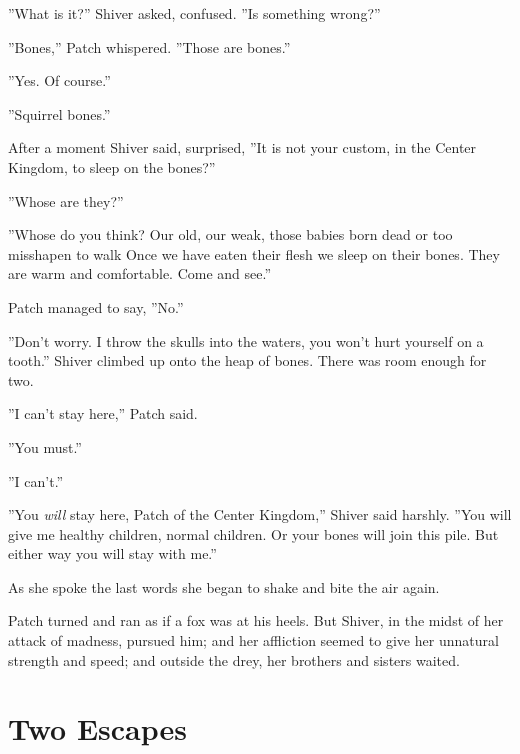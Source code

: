 \documentclass[12pt]{book}
\begin{document}
''What is it?'' Shiver asked, confused. ''Is something wrong?''\par
''Bones,'' Patch whispered. ''Those are bones.''\par
''Yes. Of course.''\par
''Squirrel bones.''\par
After a moment Shiver said, surprised, ''It is not your custom, in the Center Kingdom, to sleep on the bones?''\par
''Whose are they?''\par
''Whose do you think? Our old, our weak, those babies born dead or too misshapen to walk%
Once we have eaten their flesh we sleep on their bones. They are warm and comfortable. Come and see.''\par
Patch managed to say, ''No.''\par
''Don't worry. I throw the skulls into the waters, you won't hurt yourself on a tooth.'' Shiver climbed up onto the heap of bones. There was room enough for two.\par
 ''I can't stay here,'' Patch said.\par
 ''You must.''\par
 ''I can't.''\par
 ''You {\it will} stay here, Patch of the Center Kingdom,'' Shiver said harshly. ''You will give me healthy children, normal children. Or your bones will join this pile. But either way you will stay with me.''\par
 As she spoke the last words she began to shake and bite the air again.\par
Patch turned and ran as if a fox was at his heels. But Shiver, in the midst of her attack of madness, pursued him; and her affliction seemed to give her unnatural strength and speed; and outside the drey, her brothers and sisters waited.\par

\section{Two Escapes}
\end{document}
